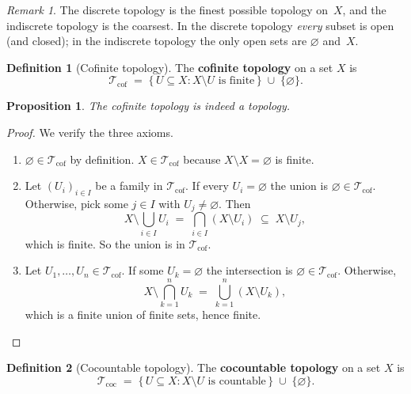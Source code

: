 \documentclass[11pt,a4paper,twoside]{book}
\newtheorem{proposition}[theorem]{Proposition}
\theoremstyle{remark}
\newtheorem{remark}[theorem]{Remark}
\theoremstyle{definition}
\theoremstyle{definition}
\newtheorem{definition}{Definition}[section]
\newcommand{\Tau}{\mathcal{T}}           %
\begin{document}
\begin{remark}
The discrete topology is the finest possible topology on~$X$, and the
indiscrete topology is the coarsest.  In the discrete topology \emph{every}
subset is open (and closed); in the indiscrete topology the only open sets are
$\varnothing$ and~$X$.
\end{remark}

\begin{definition}[Cofinite topology]\label{def:cofinite}
The \textbf{cofinite topology}
on a set $X$ is
\[
  \Tau_{\mathrm{cof}}
  \;=\;
  \{\, U\subseteq X : X\setminus U \text{ is finite}\,\}
  \;\cup\;
  \{\varnothing\}.
\]
\end{definition}

\begin{proposition}\label{prop:cofinite-is-topology}
The cofinite topology is indeed a topology.
\end{proposition}
\begin{proof}
We verify the three axioms.
\begin{enumerate}[label=(\roman*)]
  \item $\varnothing\in\Tau_{\mathrm{cof}}$ by definition.
        $X\in\Tau_{\mathrm{cof}}$ because $X\setminus X=\varnothing$ is finite.
  \item Let $(U_i)_{i\in I}$ be a family in $\Tau_{\mathrm{cof}}$.
        If every $U_i=\varnothing$ the union is $\varnothing\in\Tau_{\mathrm{cof}}$.
        Otherwise, pick some $j\in I$ with $U_j\neq\varnothing$.  Then
        \[
          X\setminus\bigcup_{i\in I}U_i
          \;=\;\bigcap_{i\in I}(X\setminus U_i)
          \;\subseteq\; X\setminus U_j,
        \]
        which is finite.  So the union is in $\Tau_{\mathrm{cof}}$.
  \item Let $U_1,\ldots,U_n\in\Tau_{\mathrm{cof}}$.  If some $U_k=\varnothing$
        the intersection is $\varnothing\in\Tau_{\mathrm{cof}}$.  Otherwise,
        \[
          X\setminus\bigcap_{k=1}^{n}U_k
          \;=\;\bigcup_{k=1}^{n}(X\setminus U_k),
        \]
        which is a finite union of finite sets, hence finite.  \qedhere
\end{enumerate}
\end{proof}

\begin{definition}[Cocountable topology]\label{def:cocountable}
The \textbf{cocountable topology}
on a set $X$ is
\[
  \Tau_{\mathrm{coc}}
  \;=\;
  \{\, U\subseteq X : X\setminus U \text{ is countable}\,\}
  \;\cup\;
  \{\varnothing\}.
\]
\end{definition}
\end{document}
